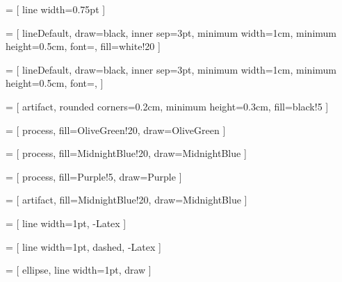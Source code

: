 \newcommand{\hide}[1]{}



\newcommand{\RQ}[1]{\textbf{RQ#1}}

\newcommand\owltopddl{Owl2PDDL\xspace}
\newcommand\planta{PLANTA\xspace}
\newcommand{\CamaraApproach}{\textsc{Camara}\xspace}
\newcommand\plansys{PlanSys2\xspace}
\newcommand\tomasys{TOMASys\xspace}
\newcommand\pddltomasys{PDDL-TOMASys\xspace}

\newcommand{\Uone}{\emph{U1}\xspace}
\newcommand{\Utwo}{\emph{U2}\xspace}
\newcommand{\Uthree}{\emph{U3}\xspace}


\newcommand{\greenColor}{OliveGreen} 	%
\newcommand{\blueColor}{MidnightBlue}	%
\newcommand{\redColor}{BrickRed}
\newcommand{\purpleColor}{Purple}

 = [
    line width=0.75pt
]

 = [
lineDefault,
draw=black,
inner sep=3pt,
minimum width=1cm,
minimum height=0.5cm,
font=\sffamily,
fill=white!20
]

 = [
lineDefault,
draw=black,
inner sep=3pt,
minimum width=1cm,
minimum height=0.5cm,
font=\sffamily,
]

 = [
artifact,
rounded corners=0.2cm,
minimum height=0.3cm,
fill=black!5
]

 = [
    process,
    fill=\greenColor!20,
    draw=\greenColor
]

 = [
    process,
    fill=\blueColor!20,
    draw=\blueColor
]

 = [
    process,
    fill=\purpleColor!5,
    draw=\purpleColor
]

 = [
    artifact,
    fill=\blueColor!20,
    draw=\blueColor
]

 = [
    line width=1pt,
    -Latex
]

 = [
    line width=1pt,
    dashed,
    -Latex
]

 = [
    ellipse,
    line width=1pt,
    draw
]

